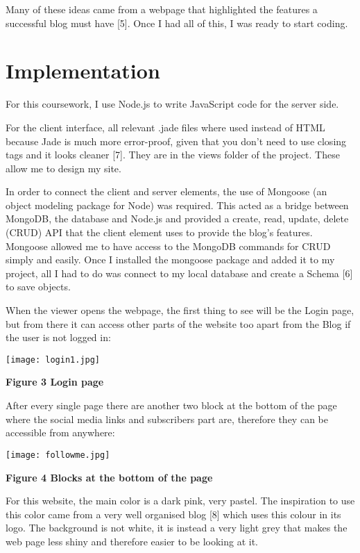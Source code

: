 \documentclass[10pt, a4paper]{article}
\begin{document}
    Many of these ideas came from a webpage that highlighted the features a successful blog must have [5].
    Once I had all of this, I was ready to start coding.




    \section{Implementation}
    For this coursework, I use Node.js to write JavaScript code for the server side.

    For the client interface, all relevant .jade files where used instead of HTML because Jade is much more error-proof, given that you don't need to use closing tags and it looks cleaner [7]. They are in the views folder of the project. These allow me to design my site.

    In order to connect the client and server elements, the use of Mongoose (an object modeling package for Node) was required. This acted as a bridge between MongoDB, the database and Node.js and provided a create, read, update, delete (CRUD) API that the client element uses to provide the blog's features. Mongoose allowed me to have access to the MongoDB commands for CRUD simply and easily. Once I installed the mongoose package and added it to my project, all I had to do was connect to my local database and create a Schema [6] to save objects.

    When the viewer opens the webpage, the first thing to see will be the Login page, but from there it can access other parts of the website too apart from the Blog if the user is not logged in:

    \texttt{[image: login1.jpg]}

    \textbf{Figure 3 Login page}
    \vspace{2mm}

    After every single page there are another two block at the bottom of the page where the social media links and subscribers part are, therefore they can be accessible from anywhere:

    \texttt{[image: followme.jpg]}

    \textbf{Figure 4 Blocks at the bottom of the page}
    \vspace{2mm}

    For this website, the main color is a dark pink, very pastel. The inspiration to use this color came from a very well organised blog [8] which uses this colour in its logo.
    The background is not white, it is instead a very light grey that makes the web page less shiny and therefore easier to be looking at it.
\end{document}
